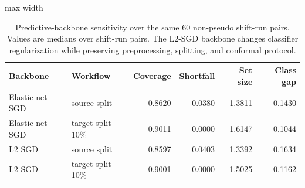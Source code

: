 \begin{table}[!tbp]
\centering
\caption{Predictive-backbone sensitivity over the same 60 non-pseudo shift-run pairs. Values are medians over shift-run pairs. The L2-SGD backbone changes classifier regularization while preserving preprocessing, splitting, and conformal protocol.}
\label{primary-tab:backbone_sensitivity}
\footnotesize
\setlength{\tabcolsep}{3pt}
\begin{adjustbox}{max width=\columnwidth}
\begin{tabular}{llrrrr}
\toprule
Backbone & Workflow & Coverage & Shortfall & Set size & Class gap \\
\midrule
Elastic-net SGD & source split & 0.8620 & 0.0380 & 1.3811 & 0.1430 \\
Elastic-net SGD & target split 10\% & 0.9011 & 0.0000 & 1.6147 & 0.1044 \\
L2 SGD & source split & 0.8597 & 0.0403 & 1.3392 & 0.1634 \\
L2 SGD & target split 10\% & 0.9001 & 0.0000 & 1.5025 & 0.1162 \\
\bottomrule
\end{tabular}
\end{adjustbox}
\end{table}
